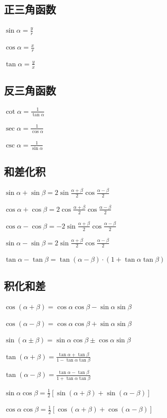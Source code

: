 \documentclass[UTF8]{ctexbook}
\begin{document}
{{\subsection{正三角函数}{
  $\sin{\alpha} = \frac{y}{r}$

  $\cos{\alpha} = \frac{x}{r}$

  $\tan{\alpha} = \frac{y}{x}$
}
\subsection{反三角函数}{
  $\cot{\alpha} = \frac{1}{\tan{\alpha}}$

  $\sec{\alpha} = \frac{1}{\cos{\alpha}}$

  $\csc{\alpha} = \frac{1}{\sin{\alpha}}$
}

\subsection{和差化积}{
  $\sin{\alpha}+\sin{\beta} = 2\sin{\frac{\alpha + \beta}{2}}\cos{\frac{\alpha - \beta}{2}}$

  $\cos{\alpha}+\cos{\beta} = 2\cos{\frac{\alpha + \beta}{2}\cos{\frac{\alpha-\beta}{2}}}$

  $\cos{\alpha}-\cos{\beta} = -2\sin{\frac{\alpha + \beta}{2}}\cos{\frac{\alpha - \beta}{2}}$

  $\sin{\alpha}-\sin{\beta} = 2\sin{\frac{\alpha + \beta}{2}}\cos{\frac{\alpha - \beta}{2}}$

  $\tan\alpha - \tan\beta = \tan(\alpha - \beta) \cdot (1 + \tan\alpha\tan\beta)$
}

\subsection{积化和差}{
  $\cos(\alpha + \beta) = \cos{\alpha}\cos{\beta} - \sin{\alpha}\sin{\beta}$

  $\cos(\alpha - \beta) = \cos{\alpha}\cos{\beta} + \sin{\alpha}\sin{\beta}$

  $\sin(\alpha \pm \beta) = \sin{\alpha}\cos{\beta} \pm \cos{\alpha}\sin{\beta}$

  $\tan(\alpha + \beta) = \frac{\tan\alpha + \tan\beta}{1 - \tan\alpha\tan\beta}$

  $\tan(\alpha - \beta) = \frac{\tan\alpha - \tan\beta}{1 + \tan\alpha\tan\beta}$

  $\sin{\alpha}\cos{\beta} = \frac{1}{2}[\sin{(\alpha + \beta)} + \sin{(\alpha - \beta)}]$

  $\cos{\alpha}\cos{\beta} = \frac{1}{2}[\cos{(\alpha + \beta)} + \cos{(\alpha - \beta)}]$

}}}
\end{document}
